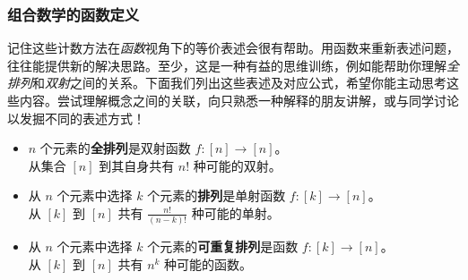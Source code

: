 \subsubsection*{组合数学的函数定义}

记住这些计数方法在\emph{函数}视角下的等价表述会很有帮助。用函数来重新表述问题，往往能提供新的解决思路。至少，这是一种有益的思维训练，例如能帮助你理解\emph{全排列}和\emph{双射}之间的关系。下面我们列出这些表述及对应公式，希望你能主动思考这些内容。尝试理解概念之间的关联，向只熟悉一种解释的朋友讲解，或与同学讨论以发掘不同的表述方式！

\begin{itemize}
    \item $n$ 个元素的\textbf{全排列}是双射函数 $f : [n] \to [n]$。\\
          从集合 $[n]$ 到其自身共有 $n!$ 种可能的双射。
    \item 从 $n$ 个元素中选择 $k$ 个元素的\textbf{排列}是单射函数 $f : [k] \to [n]$。\\
          从 $[k]$ 到 $[n]$ 共有 $\frac{n!}{(n-k)!}$ 种可能的单射。
    \item 从 $n$ 个元素中选择 $k$ 个元素的\textbf{可重复排列}是函数 $f : [k] \to [n]$。 \\
          从 $[k]$ 到 $[n]$ 共有 $n^k$ 种可能的函数。
\end{itemize}